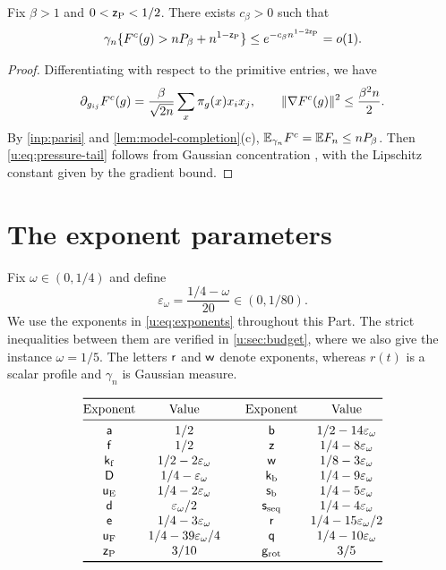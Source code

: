 \begin{lemma}\label{u:lem:pressure-tail}
Fix $\beta>1$ and $0<\mathsf{z}_{\rm P}<1/2$. There exists $c_\beta>0$
such that
\begin{equation}\label{u:eq:pressure-tail}
 \gamma_n\{F^c(g)>nP_\beta+n^{1-\mathsf{z}_{\rm P}}\}
 \le e^{-c_\beta n^{1-2\mathsf{z}_{\rm P}}}=o(1).
\end{equation}
\end{lemma}

\begin{proof}
Differentiating with respect to the primitive entries, we have
\[
 \partial_{g_{ij}}F^c(g)
 =\frac\beta{\sqrt{2n}}\sum_x\pi_g(x)x_ix_j,\qquad
 \lVert \nabla F^c(g)\rVert^2\le\frac{\beta^2n}{2}.
\]
By \cref{inp:parisi} and \cref{lem:model-completion}(c),
$\mathbb E_{\gamma_n}F^c=\mathbb E F_n\le nP_\beta$. Then \eqref{u:eq:pressure-tail}
follows from Gaussian concentration
\cite{tsirelson-ibragimov-sudakov-1976}, with the Lipschitz constant
given by the gradient bound.
\end{proof}

\section{The exponent parameters}\label{u:sec:parameters}

Fix $\omega\in(0,1/4)$ and define
\begin{equation}\label{u:eq:epsilon-omega}
 \varepsilon_\omega=\frac{1/4-\omega}{20}\in(0,1/80).
\end{equation}
We use the exponents in \eqref{u:eq:exponents} throughout this Part.
The strict inequalities between them are verified in
\cref{u:sec:budget}, where
we also give the instance $\omega=1/5$. The letters $\mathsf{r}$ and
$\mathsf{w}$ denote exponents, whereas $r(t)$ is a scalar profile and
$\gamma_n$ is Gaussian measure.

\begin{equation}\label{u:eq:exponents}
\begin{array}{@{}cc@{\qquad}cc@{}}
\toprule
\text{Exponent} & \text{Value} & \text{Exponent} & \text{Value}\\
\midrule
\ex a & 1/2 & \ex b & 1/2-14\varepsilon_\omega\\
\ex f & 1/2 & \ex z & 1/4-8\varepsilon_\omega\\
\ex k_{\rm f} & 1/2-2\varepsilon_\omega & \ex w & 1/8-3\varepsilon_\omega\\
\ex D & 1/4-\varepsilon_\omega & \ex k_{\rm b} & 1/4-9\varepsilon_\omega\\
\ex u_{\rm E} & 1/4-2\varepsilon_\omega & \ex s_{\rm b} & 1/4-5\varepsilon_\omega\\
\ex d & \varepsilon_\omega/2 & \ex s_{\rm seq} & 1/4-4\varepsilon_\omega\\
\ex e & 1/4-3\varepsilon_\omega & \ex r & 1/4-15\varepsilon_\omega/2\\
\ex u_{\rm F} & 1/4-39\varepsilon_\omega/4 & \ex q & 1/4-10\varepsilon_\omega\\
\ex z_{\rm P} & 3/10 & \ex g_{\rm rot} & 3/5\\
\bottomrule
\end{array}
\end{equation}

